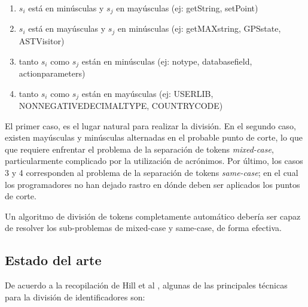 \begin{enumerate}
  \item $s_i$ está en minúsculas y $s_j$ en mayúsculas (ej: getString, setPoint)
  \item $s_i$ está en mayúsculas y $s_j$ en minúsculas (ej: getMAXstring, GPSstate, ASTVisitor)
  \item tanto $s_i$ como $s_j$ están en minúsculas (ej: notype, databasefield, actionparameters)
  \item tanto $s_i$ como $s_j$ están en mayúsculas (ej: USERLIB, NONNEGATIVEDECIMALTYPE, COUNTRYCODE)
\end{enumerate}

El primer caso, es el lugar natural para realizar la división.
En el segundo caso, existen mayúsculas y minúsculas alternadas en el probable punto de corte, lo que que requiere enfrentar el problema de la separación de tokens \textit{mixed-case}, particularmente complicado por la utilización de acrónimos.
Por último, los casos 3 y 4 corresponden al problema de la separación de tokens \textit{same-case}; en el cual los programadores no han dejado rastro en dónde deben ser aplicados los puntos de corte.

Un algoritmo de división de tokens completamente automático debería ser capaz de resolver los sub-problemas de mixed-case y same-case, de forma efectiva.

\subsection{Estado del arte}
De acuerdo a la recopilación de Hill et al \cite{HillBinkleyLawrie14}, algunas de las principales técnicas para la división de identificadores son:

